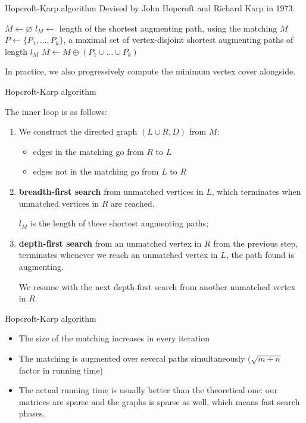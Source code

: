 \begin{frame}{Hopcroft-Karp algorithm}
Devised by John Hopcroft and Richard Karp in 1973.

\begin{algorithm}[H]
	\footnotesize 
	\begin{algorithmic}
		\State $M \gets \varnothing$
		\Repeat
		\State $l_M \gets$ length of the shortest augmenting path, using the matching $M$
		\State $P \gets \{ P_1,\dots,P_k \}$, a maximal set of vertex-disjoint shortest augmenting paths of length $l_M$
		\State $M \gets M \oplus (P_1 \cup \dots \cup P_k )$
	\end{algorithmic}
\end{algorithm}

In practice, we also progressively compute the minimum vertex cover alongside.

\end{frame}

\begin{frame}{Hopcroft-Karp algorithm}

	The inner loop is as follows:

	\begin{enumerate}
\item We construct the directed graph $(L \cup R, D)$ from $M$:
\begin{itemize}
	\item edges in the matching go from $R$ to $L$
	\item edges not in the matching go from $L$ to $R$
\end{itemize}
\item \textbf{breadth-first search} from unmatched vertices in $L$, which terminates when unmatched vertices in $R$ are reached. 

	$l_M$ is the length of these shortest augmenting paths;
\item \textbf{depth-first search} from an unmatched vertex in $R$ from the previous step, terminates whenever we reach an unmatched vertex in $L$, the path found is augmenting. 
	
We resume with the next depth-first search from another unmatched vertex in $R$.
\end{enumerate}
\end{frame}

\begin{frame}{Hopcroft-Karp algorithm}
\begin{itemize}\itemsep=0.4cm
		\item The size of the matching increases in every iteration
		\item The matching is augmented over several paths simultaneously ($\sqrt{m+n}$ factor in running time)
		\item The actual running time is usually better than the theoretical one: our matrices are sparse and the graphs is sparse as well, which means fast search phases.
	\end{itemize}
\end{frame}

